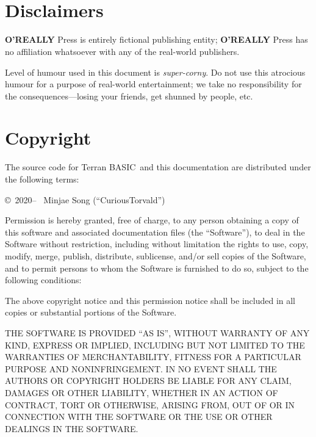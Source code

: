 \documentclass[10pt, stock, openany, chapter]{memoir}
\newcommand{\tbas}{Terran BASIC}
\newcommand{\oreallypress}{\begingroup\hspace{0.083em}\large\textbf{O'REALLY\raisebox{1ex}{\scriptsize ?}} \large Press\endgroup}
\begin{document}
{
\let\clearpage\relax
\chapter*{\ \\ Disclaimers}

\oreallypress{} is entirely fictional publishing entity; \oreallypress{} has no affiliation whatsoever with any of the real-world publishers.

Level of humour used in this document is \emph{super-corny}. Do not use this atrocious humour for a purpose of real-world entertainment; we take no responsibility for the consequences---losing your friends, get shunned by people, etc.
}

\chapter{Copyright}

The source code for \tbas\ and this documentation are distributed under the following terms:

\copyright\ 2020-- \ Minjae Song (``CuriousTorvald'')

Permission is hereby granted, free of charge, to any person obtaining a copy
of this software and associated documentation files (the ``Software''), to deal
in the Software without restriction, including without limitation the rights
to use, copy, modify, merge, publish, distribute, sublicense, and/or sell
copies of the Software, and to permit persons to whom the Software is
furnished to do so, subject to the following conditions:

The above copyright notice and this permission notice shall be included in all
copies or substantial portions of the Software.

THE SOFTWARE IS PROVIDED ``AS IS'', WITHOUT WARRANTY OF ANY KIND, EXPRESS OR
IMPLIED, INCLUDING BUT NOT LIMITED TO THE WARRANTIES OF MERCHANTABILITY,
FITNESS FOR A PARTICULAR PURPOSE AND NONINFRINGEMENT. IN NO EVENT SHALL THE
AUTHORS OR COPYRIGHT HOLDERS BE LIABLE FOR ANY CLAIM, DAMAGES OR OTHER
LIABILITY, WHETHER IN AN ACTION OF CONTRACT, TORT OR OTHERWISE, ARISING FROM,
OUT OF OR IN CONNECTION WITH THE SOFTWARE OR THE USE OR OTHER DEALINGS IN THE
SOFTWARE.

\printindex

\afterpage{\pagestyle{empty}\null\newpage}
\end{document}
